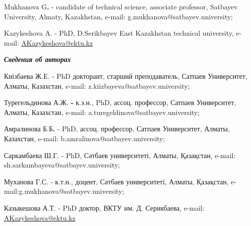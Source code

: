 Mukhanova G{\bfseries .} - candidate of technical science, associate
professor, Satbayev University, Almaty, Kazakhstan, e-mail:
g.mukhanova@satbayev.university;

Kazykeshova A. - PhD, D.Serikbayev East Kazakhstan technical university,
e-mail: \href{mailto:zh.serikbayeva@almau.edu.kz}{AKazykeshova@ektu.kz}

\emph{{\bfseries Сведения об авторах}}

Киізбаева Ж.Е. - PhD докторант, старший преподаватель, Сатпаев
Университет, Алматы, Казахстан, e-mail:
z.kiizbayeva@satbayev.university;

Турегельдинова А.Ж. {\bfseries -} к.э.н., PhD, ассоц. профессор, Сатпаев
Университет, Алматы, Казахстан, e-mail:
a.turegeldinova@satbayev.university;

Амралинова Б.Б{\bfseries .} - PhD, ассоц. профессор, Сатпаев Университет,
Алматы, Казахстан, e-mail: b.amralinova@satbayev.university;

Саркамбаева Ш.Г. - PhD, Сәтбаев университеті, Алматы, Қазақстан, e-mail:
sh.sarkambayeva@satbayev.university;

Муханова Г.С. - к.т.н., доцент, Сәтбаев университеті, Алматы, Қазақстан,
e-mail:g.mukhanova@satbayev.university;

Казыкешова А.Т. - PhD доктор, ВКТУ им. Д. Серикбаева, e-mail:
\href{mailto:zh.serikbayeva@almau.edu.kz}{AKazykeshova@ektu.kz}